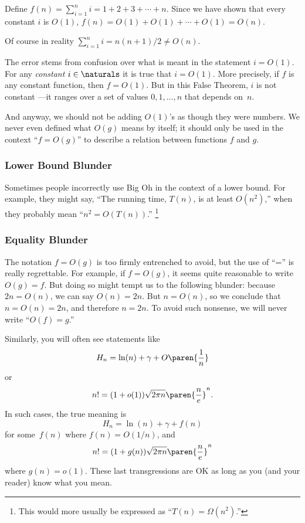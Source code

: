 \begin{bogusproof}
Define $f(n) = \sum_{i=1}^n i = 1 + 2 + 3 + \cdots + n$.  Since we
have shown that every constant $i$ is $O(1)$, $f(n) = O(1) + O(1) +
\cdots + O(1) = O(n)$.
\end{bogusproof}

Of course in reality $\sum_{i=1}^n i = n(n+1)/2 \neq O(n)$.

The error stems from confusion over what is meant in the statement $i
= O(1)$.  For any \emph{constant} $i\in \naturals$ it is true that $i
= O(1)$.  More precisely, if $f$ is any constant function, then $f =
O(1)$.  But in this False Theorem, $i$ is not constant ---it ranges
over a set of values $0, 1,\dots, n$ that depends on~$n$.

And anyway, we should not be adding $O(1)$'s as though they were numbers.
We never even defined what $O(g)$ means by itself; it should only be used
in the context ``$f = O(g)$'' to describe a relation between functions $f$
and $g$.

\subsubsection{Lower Bound Blunder}

Sometimes people incorrectly use Big Oh in the context of a lower
bound.  For example, they might say, ``The running time, $T(n)$, is at
least $O(n^2)$,'' when they probably mean ``$n^2 = O(T(n))$.''
\footnote{This would more usually be expressed as
``$T(n) = \Omega(n^2)$.''}

\subsubsection{Equality Blunder}

The notation $f = O(g)$ is too firmly entrenched to avoid, but the use of
``='' is really regrettable.  For example, if $f = O(g)$, it seems quite
reasonable to write $O(g) = f$.  But doing so might tempt us to the
following blunder: because $2n = O(n)$, we can say $O(n) = 2n$.  But $n =
O(n)$, so we conclude that $n = O(n) = 2n$, and therefore $n = 2n$.  To
avoid such nonsense, we will never write ``$O(f) = g$.''

Similarly, you will often see statements like
\[
    H_n = \ln(n) + \gamma + O\paren{\frac{1}{n}}
\]
or
\[
    n! = (1 + o(1)) \sqrt{2\pi n} \paren{\frac{n}{e}}^n.
\]
In such cases, the true meaning is
\[
    H_n = \ln(n) + \gamma + f(n)
\]
for some~$f(n)$ where $f(n) = O(1/n)$, and
\[
    n! = (1 + g(n)) \sqrt{2\pi n} \paren{\frac{n}{e}}^n
\]
where $g(n) = o(1)$.  These last transgressions are OK as long as you
(and your reader) know what you mean.

